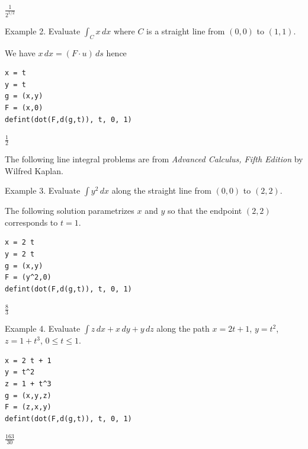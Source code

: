 $\displaystyle \frac{1}{2^{1/2}}$

\bigskip
Example 2. Evaluate $\int_Cx\,dx$
where $C$ is a straight line from $(0,0)$ to $(1,1)$.

\bigskip
We have $x\,dx=(F\cdot u)\,ds$ hence

{\color{blue}
\begin{verbatim}
x = t
y = t
g = (x,y)
F = (x,0)
defint(dot(F,d(g,t)), t, 0, 1)
\end{verbatim}}

$\displaystyle \tfrac{1}{2}$

\bigskip
The following line integral problems are from
{\it Advanced Calculus, Fifth Edition} by Wilfred Kaplan.

\bigskip
Example 3. Evaluate $\int y^2\,dx$ along the straight
line from $(0,0)$ to $(2,2)$.

\bigskip
The following solution parametrizes $x$ and $y$ so that
the endpoint $(2,2)$ corresponds to $t=1$.

{\color{blue}
\begin{verbatim}
x = 2 t
y = 2 t
g = (x,y)
F = (y^2,0)
defint(dot(F,d(g,t)), t, 0, 1)
\end{verbatim}}

$\displaystyle \tfrac{8}{3}$

\bigskip
Example 4. Evaluate $\int z\,dx+x\,dy+y\,dz$
along the path
$x=2t+1$, $y=t^2$, $z=1+t^3$, $0\le t\le 1$.

{\color{blue}
\begin{verbatim}
x = 2 t + 1
y = t^2
z = 1 + t^3
g = (x,y,z)
F = (z,x,y)
defint(dot(F,d(g,t)), t, 0, 1)
\end{verbatim}}

$\displaystyle \tfrac{163}{30}$


